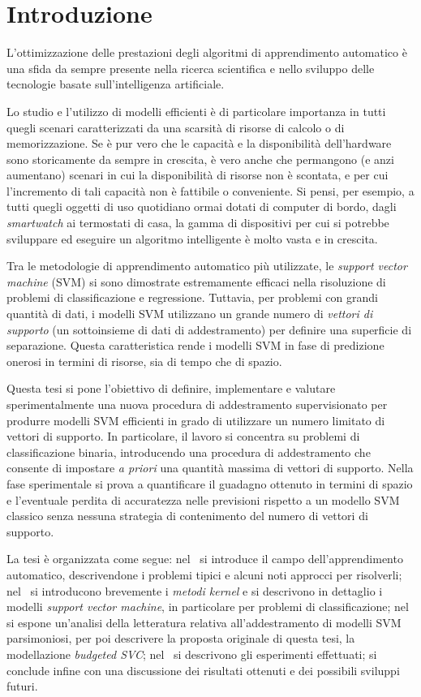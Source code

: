 \chapter{Introduzione}
\label{chap:introduzione}
L'ottimizzazione delle prestazioni degli algoritmi di apprendimento automatico è una sfida da sempre presente nella ricerca scientifica e nello sviluppo delle tecnologie basate sull'intelligenza artificiale.

Lo studio e l'utilizzo di modelli efficienti è di particolare importanza in tutti quegli scenari caratterizzati da una scarsità di risorse di calcolo o di memorizzazione.
Se è pur vero che le capacità e la disponibilità dell'hardware sono storicamente da sempre in crescita, è vero anche che permangono (e anzi aumentano) scenari in cui la disponibilità di risorse non è scontata, e per cui l'incremento di tali capacità non è fattibile o conveniente.
Si pensi, per esempio, a tutti quegli oggetti di uso quotidiano ormai dotati di computer di bordo, dagli \emph{smartwatch} ai termostati di casa, la gamma di dispositivi per cui si potrebbe sviluppare ed eseguire un algoritmo intelligente è molto vasta e in crescita.

Tra le metodologie di apprendimento automatico più utilizzate, le \emph{support vector machine} (SVM) si sono dimostrate estremamente efficaci nella risoluzione di problemi di classificazione e regressione. 
Tuttavia, per problemi con grandi quantità di dati, i modelli SVM utilizzano un grande numero di \emph{vettori di supporto} (un sottoinsieme di dati di addestramento) per definire una superficie di separazione. 
Questa caratteristica rende i modelli SVM in fase di predizione onerosi in termini di risorse, sia di tempo che di spazio.

Questa tesi si pone l'obiettivo di definire, implementare e valutare sperimentalmente una nuova procedura di addestramento supervisionato per produrre modelli SVM efficienti in grado di utilizzare un numero limitato di vettori di supporto.
In particolare, il lavoro si concentra su problemi di classificazione binaria, introducendo una procedura di addestramento che consente di impostare \emph{a priori} una quantità massima di vettori di supporto.
Nella fase sperimentale si prova a quantificare il guadagno ottenuto in termini di spazio e l'eventuale perdita di accuratezza nelle previsioni rispetto a un modello SVM classico senza nessuna strategia di contenimento del numero di vettori di supporto.

La tesi è organizzata come segue: nel~ si introduce il campo dell'apprendimento automatico, descrivendone i problemi tipici e alcuni noti approcci per risolverli; nel~ si introducono brevemente i \emph{metodi kernel} e si descrivono in dettaglio i modelli \emph{support vector machine}, in particolare per problemi di classificazione; nel~ si espone un'analisi della letteratura relativa all'addestramento di modelli SVM parsimoniosi, per poi descrivere la proposta originale di questa tesi, la modellazione \emph{budgeted SVC}; nel~ si descrivono gli esperimenti effettuati; si conclude infine con una discussione dei risultati ottenuti e dei possibili sviluppi futuri.